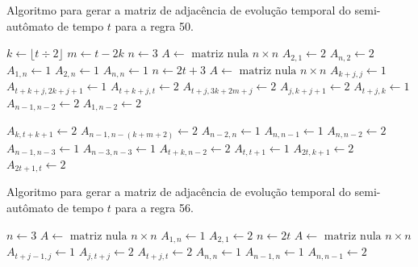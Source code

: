 \documentclass[12pt,a4paper]{article}
\begin{document}
\begin{algorithm}[H]
\caption{Algoritmo para gerar a matriz de adjacência de evolução temporal do
semi-autômato de tempo $t$ para a regra 50.}
\label{alg:r50}
\begin{algorithmic}
\STATE $k \leftarrow \lfloor t \div 2 \rfloor$
\STATE $m \leftarrow t - 2k$
    \STATE $n \leftarrow 3$
    \STATE $A \leftarrow \mbox{ matriz nula } n \times n$
    \STATE $A_{2,1} \leftarrow 2$
    \STATE $A_{n,2} \leftarrow 2$
    \STATE $A_{1,n} \leftarrow 1$
    \STATE $A_{2,n} \leftarrow 1$
    \STATE $A_{n,n} \leftarrow 1$
\ELSE
    \STATE $n \leftarrow 2t+3$
    \STATE $A \leftarrow \mbox{ matriz nula } n \times n$
        \STATE $A_{k+j,j} \leftarrow 1$
        \STATE $A_{t+k+j,2k+j+1} \leftarrow 1$
        \STATE $A_{t+k+j,t} \leftarrow 2$
    \ENDFOR
        \STATE $A_{t+j,3k+2m+j} \leftarrow 2$
        \STATE $A_{j,k+j+1} \leftarrow 2$
    \ENDFOR
        \STATE $A_{t+j,k} \leftarrow 1$
    \ENDFOR
        \STATE $A_{n-1,n-2} \leftarrow 2$
        \STATE $A_{1,n-2} \leftarrow 2$
    \ENDIF
{}
\end{algorithmic}
\end{algorithm}

\begin{algorithm}[H]
\begin{algorithmic}
        \STATE $A_{k,t+k+1} \leftarrow 2$
        \STATE $A_{n-1,n-(k+m+2)} \leftarrow 2$
    \ENDIF
    \STATE $A_{n-2,n} \leftarrow 1$
    \STATE $A_{n,n-1} \leftarrow 1$
    \STATE $A_{n,n-2} \leftarrow 2$
    \STATE $A_{n-1,n-3} \leftarrow 1$
    \STATE $A_{n-3,n-3} \leftarrow 1$
    \STATE $A_{t+k,n-2} \leftarrow 2$
    \STATE $A_{t,t+1} \leftarrow 1$
    \STATE $A_{2t,k+1} \leftarrow 2$
    \STATE $A_{2t+1,t} \leftarrow 2$
\ENDIF
\end{algorithmic}
\end{algorithm}

\begin{algorithm}[H]
\caption{Algoritmo para gerar a matriz de adjacência de evolução temporal do
semi-autômato de tempo $t$ para a regra 56.}
\label{alg:r56}
\begin{algorithmic}
    \STATE $n \leftarrow 3$
    \STATE $A \leftarrow \mbox{ matriz nula } n \times n$
    \STATE $A_{1,n} \leftarrow 1$
    \STATE $A_{2,1} \leftarrow 2$
\ELSE
    \STATE $n \leftarrow 2t$
    \STATE $A \leftarrow \mbox{ matriz nula } n \times n$
        \STATE $A_{t+j-1,j} \leftarrow 1$
        \STATE $A_{j,t+j} \leftarrow 2$
        \STATE $A_{t+j,t} \leftarrow 2$
    \ENDFOR
\ENDIF
\STATE $A_{n,n} \leftarrow 1$
\STATE $A_{n-1,n} \leftarrow 1$
\STATE $A_{n,n-1} \leftarrow 2$
\end{algorithmic}
\end{algorithm}
\end{document}

